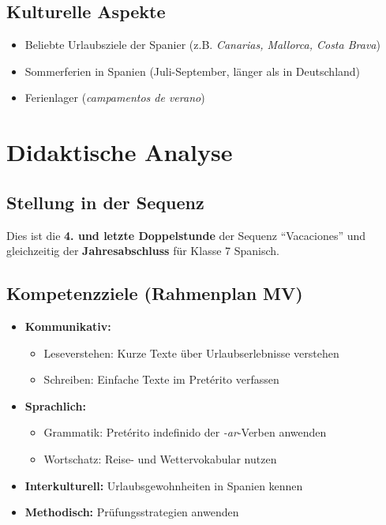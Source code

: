\documentclass[11pt,a4paper]{article}
\newcommand{\reihenthema}{Vacaciones}
\begin{document}
\subsection{Kulturelle Aspekte}
\begin{itemize}
    \item Beliebte Urlaubsziele der Spanier (z.B. \textit{Canarias, Mallorca, Costa Brava})
    \item Sommerferien in Spanien (Juli-September, länger als in Deutschland)
    \item Ferienlager (\textit{campamentos de verano})
\end{itemize}

\section{Didaktische Analyse}

\subsection{Stellung in der Sequenz}
Dies ist die \textbf{4. und letzte Doppelstunde} der Sequenz ``\reihenthema'' und gleichzeitig der \textbf{Jahresabschluss} für Klasse 7 Spanisch.

\subsection{Kompetenzziele (Rahmenplan MV)}
\begin{itemize}
    \item \textbf{Kommunikativ:}
    \begin{itemize}
        \item Leseverstehen: Kurze Texte über Urlaubserlebnisse verstehen
        \item Schreiben: Einfache Texte im Pretérito verfassen
    \end{itemize}
    \item \textbf{Sprachlich:}
    \begin{itemize}
        \item Grammatik: Pretérito indefinido der \textit{-ar}-Verben anwenden
        \item Wortschatz: Reise- und Wettervokabular nutzen
    \end{itemize}
    \item \textbf{Interkulturell:} Urlaubsgewohnheiten in Spanien kennen
    \item \textbf{Methodisch:} Prüfungsstrategien anwenden
\end{itemize}
\end{document}
